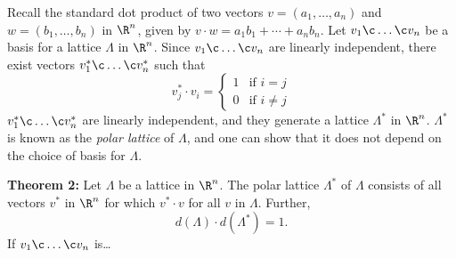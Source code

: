 Recall the standard dot product of two vectors $v=(a_1,\dotsc,a_n)$ and $w=(b_1,\dotsc,b_n)$ in $\R^n$, given by $v\cdot w=a_1b_1+\dotsb+a_nb_n$.  Let $v_1\c \dotsc\c v_n$ be a basis for a lattice $\Lambda$ in $\R^n$.  Since $v_1\c \dotsc\c v_n$ are linearly independent, there exist vectors $v^*_1\c \dotsc\c v^*_n$ such that
\[ v^*_j \cdot v_i = \begin{cases}
1 & \text{if $i=j$} \\
0 & \text{if $i\neq j$}
\end{cases} \]
$v^*_1\c \dotsc\c v^*_n$ are linearly independent, and they generate a lattice $\Lambda^*$ in $\R^n$.  $\Lambda^*$ is known as the \emph{polar lattice} of $\Lambda$, and one can show that it does not depend on the choice of basis for $\Lambda$.

\textbf{Theorem 2:}  Let $\Lambda$ be a lattice in $\R^n$.  The polar lattice $\Lambda^*$ of $\Lambda$ consists of all vectors $v^*$ in $\R^n$ for which $v^*\cdot v$ for all $v$ in $\Lambda$.  Further,
\[ d(\Lambda)\cdot d(\Lambda^*) = 1 . \]
\pf If $v_1\c \dotsc\c v_n$ is\ldots
